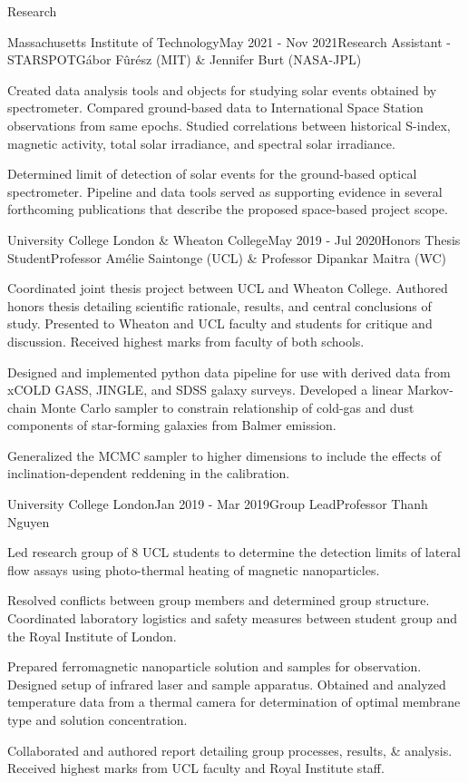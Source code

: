 \documentclass{resume} %
\begin{document}
\begin{rSection}{Research}
\begin{rSubsection}{Massachusetts Institute of Technology}{May 2021 - Nov 2021}{Research Assistant - STARSPOT}{G\'abor F\^ur\'esz (MIT) \& Jennifer Burt (NASA-JPL)}
\item Created data analysis tools and objects for studying solar events obtained by spectrometer. Compared ground-based data to International Space Station observations from same epochs. Studied correlations between historical S-index, magnetic activity, total solar irradiance, and spectral solar irradiance.
\item Determined limit of detection of solar events for the ground-based optical spectrometer. Pipeline and data tools served as supporting evidence in several forthcoming publications that describe the proposed space-based project scope.
\end{rSubsection}

\begin{rSubsection}{University College London \& Wheaton College}{May 2019 - Jul 2020}{Honors Thesis Student}{Professor Am\'{e}lie Saintonge (UCL) \& Professor Dipankar Maitra (WC)}
\item Coordinated joint thesis project between UCL and Wheaton College. Authored honors thesis detailing scientific rationale, results, and central conclusions of study. Presented to Wheaton and UCL faculty and students for critique and discussion. Received highest marks from faculty of both schools.
\item Designed and implemented python data pipeline for use with derived data from xCOLD GASS, JINGLE, and SDSS galaxy surveys. Developed a linear Markov-chain Monte Carlo sampler to constrain relationship of cold-gas and dust components of star-forming galaxies from Balmer emission.
\item Generalized the MCMC sampler to higher dimensions to include the effects of inclination-dependent reddening in the calibration.
\end{rSubsection}
\begin{rSubsection}{University College London}{Jan 2019 - Mar 2019}{Group Lead}{Professor Thanh Nguyen}
\item Led research group of 8 UCL students to determine the detection limits of lateral flow assays using photo-thermal heating of magnetic nanoparticles.
\item Resolved conflicts between group members and determined group structure. Coordinated laboratory logistics and safety measures between student group and the Royal Institute of London.
\item Prepared ferromagnetic nanoparticle solution and samples for observation. Designed setup of infrared laser and sample apparatus. Obtained and analyzed temperature data from a thermal camera for determination of optimal membrane type and solution concentration.
\item Collaborated and authored report detailing group processes, results, \& analysis. Received highest marks from UCL faculty and Royal Institute staff.
\end{rSubsection}


\end{rSection}
\end{document}
